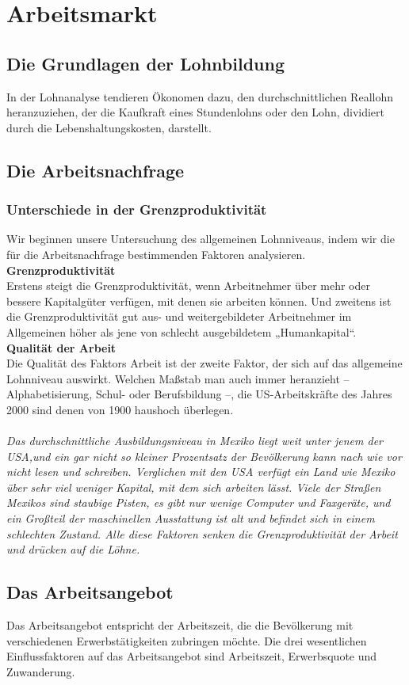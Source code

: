 \documentclass[10pt]{scrartcl}
\begin{document}
\section{Arbeitsmarkt}
\subsection{Die Grundlagen der Lohnbildung}
In der Lohnanalyse tendieren Ökonomen dazu, den durchschnittlichen Reallohn heranzuziehen, der die Kaufkraft eines Stundenlohns oder den Lohn, dividiert durch die Lebenshaltungskosten, darstellt. 
\subsection{Die Arbeitsnachfrage}
\subsubsection{Unterschiede in der Grenzproduktivität}
Wir beginnen unsere Untersuchung des allgemeinen Lohnniveaus, indem wir die für die Arbeitsnachfrage bestimmenden Faktoren analysieren.\\
{\bf Grenzproduktivität}\\
Erstens steigt die Grenzproduktivität, wenn Arbeitnehmer über mehr oder bessere Kapitalgüter verfügen, mit denen sie arbeiten können. Und zweitens ist die Grenzproduktivität gut aus- und weitergebildeter Arbeitnehmer im Allgemeinen höher als jene von schlecht ausgebildetem „Humankapital“. \\
{\bf Qualität der Arbeit}\\
Die Qualität des Faktors Arbeit ist der zweite Faktor, der sich auf das allgemeine Lohnniveau auswirkt. Welchen Maßstab man auch immer heranzieht – Alphabetisierung, Schul- oder Berufsbildung –, die US-Arbeitskräfte des Jahres 2000 sind denen von 1900 haushoch überlegen. \\ \\
{\it Das durchschnittliche Ausbildungsniveau in Mexiko liegt weit unter jenem der USA,und ein gar nicht so kleiner Prozentsatz der Bevölkerung kann nach wie vor nicht lesen und schreiben. Verglichen mit den USA verfügt ein Land wie Mexiko über sehr viel weniger Kapital, mit dem sich arbeiten lässt. Viele der Straßen Mexikos sind staubige Pisten, es gibt nur wenige Computer und Faxgeräte, und ein Großteil der maschinellen Ausstattung ist alt und befindet sich in einem schlechten Zustand. Alle diese Faktoren senken die Grenzproduktivität der Arbeit und drücken auf die Löhne.}
\subsection{Das Arbeitsangebot}
Das Arbeitsangebot entspricht der Arbeitszeit, die die Bevölkerung mit verschiedenen Erwerbstätigkeiten zubringen möchte. Die drei wesentlichen Einflussfaktoren auf das Arbeitsangebot sind Arbeitszeit, Erwerbsquote und Zuwanderung.\\
\end{document}
